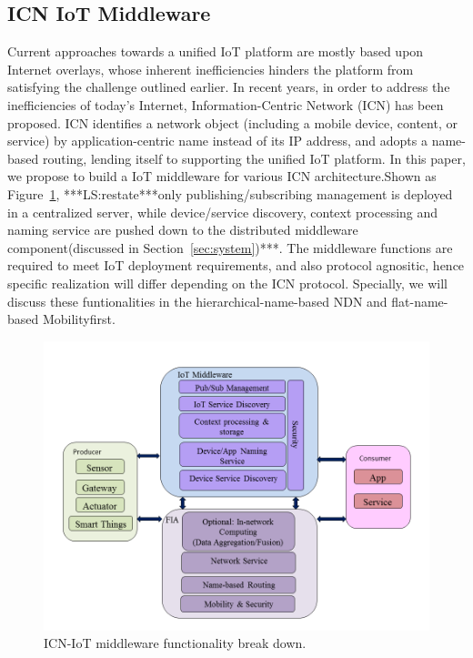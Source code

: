 \subsection{ICN IoT Middleware}
Current approaches towards a unified IoT platform are mostly based upon Internet overlays, whose inherent inefficiencies hinders the platform from satisfying the challenge outlined earlier. In recent years, in order to address  the inefficiencies of today's Internet, Information-Centric Network (ICN) has been proposed. ICN identifies a network object (including a mobile device, content, or service) by application-centric name instead of its IP address, and adopts a name-based routing, lending itself to supporting the unified IoT platform. In this paper, we propose to build a IoT middleware for various ICN architecture.Shown as Figure~\ref{fig:mid_arch}, ***LS:restate***only publishing/subscribing management is deployed in a centralized server, while device/service discovery, context processing and naming service are pushed down to the distributed middleware component(discussed in Section~\ref{sec:system})***. The middleware functions are required to meet IoT deployment requirements, and also protocol agnositic, hence specific realization will differ depending on the ICN protocol. Specially, we will discuss these funtionalities in the hierarchical-name-based NDN and flat-name-based Mobilityfirst. 
\begin{figure}
\centering
\includegraphics[width=\columnwidth]{figure/middleware_architecture.png}
\caption{\label{fig:mid_arch} ICN-IoT middleware functionality break down.}
\end{figure}
